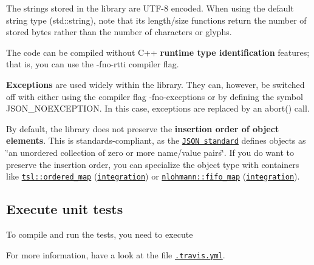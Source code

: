 \begin{DoxyItemize}
\begin{DoxyItemize}
\item The strings stored in the library are U\+T\+F-\/8 encoded. When using the default string type ({\ttfamily std\+::string}), note that its length/size functions return the number of stored bytes rather than the number of characters or glyphs.
\end{DoxyItemize}
\item The code can be compiled without C++ {\bfseries runtime type identification} features; that is, you can use the {\ttfamily -\/fno-\/rtti} compiler flag.
\item {\bfseries Exceptions} are used widely within the library. They can, however, be switched off with either using the compiler flag {\ttfamily -\/fno-\/exceptions} or by defining the symbol {\ttfamily J\+S\+O\+N\+\_\+\+N\+O\+E\+X\+C\+E\+P\+T\+I\+ON}. In this case, exceptions are replaced by an {\ttfamily abort()} call.
\item By default, the library does not preserve the {\bfseries insertion order of object elements}. This is standards-\/compliant, as the \href{https://tools.ietf.org/html/rfc7159.html}{\tt J\+S\+ON standard} defines objects as \char`\"{}an unordered collection of zero or more name/value pairs\char`\"{}. If you do want to preserve the insertion order, you can specialize the object type with containers like \href{https://github.com/Tessil/ordered-map}{\tt {\ttfamily tsl\+::ordered\+\_\+map}} (\href{https://github.com/nlohmann/json/issues/546#issuecomment-304447518}{\tt integration}) or \href{https://github.com/nlohmann/fifo_map}{\tt {\ttfamily nlohmann\+::fifo\+\_\+map}} (\href{https://github.com/nlohmann/json/issues/485#issuecomment-333652309}{\tt integration}).
\end{DoxyItemize}

\subsection*{Execute unit tests}

To compile and run the tests, you need to execute




For more information, have a look at the file \href{https://github.com/nlohmann/json/blob/master/.travis.yml}{\tt .travis.\+yml}. 